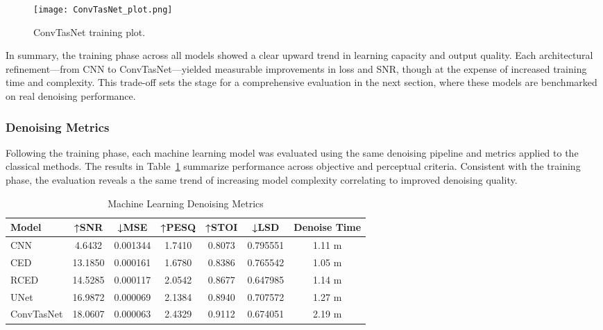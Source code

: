 \begin{figure}[H]
    \centering
    \texttt{[image: ConvTasNet\_plot.png]}
    \caption{\label{fig:convtasnet_training_plot} ConvTasNet training plot.}
\end{figure}

In summary, the training phase across all models showed a clear upward trend in learning capacity and output quality. Each architectural refinement—from CNN to ConvTasNet—yielded measurable improvements in loss and SNR, though at the expense of increased training time and complexity. This trade-off sets the stage for a comprehensive evaluation in the next section, where these models are benchmarked on real denoising performance.

\subsubsection{Denoising Metrics}
\label{sec:denoising_metrics}

Following the training phase, each machine learning model was evaluated using the same denoising pipeline and metrics applied to the classical methods. The results in Table~\ref{tab:ml_denoise} summarize performance across objective and perceptual criteria. Consistent with the training phase, the evaluation reveals a the same trend of increasing model complexity correlating to improved denoising quality.

\vspace{1em}
\begin{table}[H]
\centering
\caption{Machine Learning Denoising Metrics}
\label{tab:ml_denoise}
\begin{tabular}{|l|c|c|c|c|c|c|}
\hline
\textbf{Model} & \textbf{↑SNR} & \textbf{↓MSE} & \textbf{↑PESQ} & \textbf{↑STOI} & \textbf{↓LSD} & \textbf{Denoise Time} \\
\hline
CNN         & 4.6432  & 0.001344 & 1.7410 & 0.8073 & 0.795551 & 1.11 m \\
CED         & 13.1850  & 0.000161 & 1.6780 & 0.8386 & 0.765542 & 1.05 m \\
RCED        & 14.5285  & 0.000117 & 2.0542 & 0.8677 & 0.647985 & 1.14 m \\
UNet        & 16.9872  & 0.000069 & 2.1384 & 0.8940 & 0.707572 & 1.27 m \\
ConvTasNet  & 18.0607 & 0.000063 & 2.4329 & 0.9112 & 0.674051 & 2.19 m \\
\hline
\end{tabular}
\end{table}

